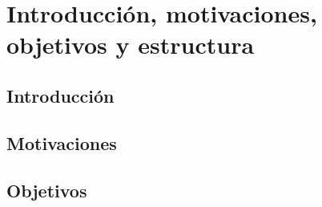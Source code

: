 \chapter{Introducción, motivaciones, objetivos y estructura}
	\label{chap:one}
    
\section{Introducción}


\section{Motivaciones}


\section{Objetivos}
